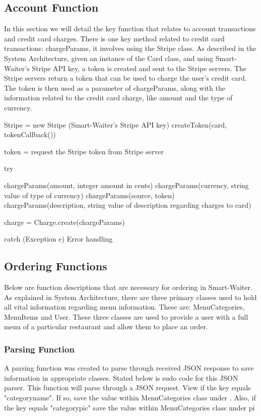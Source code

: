 \documentclass[12pt, titlepage]{article}
\begin{document}
\subsection{Account Function}
In this section we will detail the key function that relates to account transactions and credit card charges. There is one key method related to credit card transactions: chargeParams, it involves using the Stripe class. As described in the System Architecture, given an instance of the Card class, and using Smart-Waiter's Stripe API key, a token is created and sent to the Stripe servers. The Stripe servers return a token that can be used to charge the user's credit card. The token is then used as a parameter of chargeParams, along with the information related to the credit card charge, like amount and the type of currency. 

Stripe = new Stripe (Smart-Waiter's Stripe API key)
createToken(card, tokenCallback())

token = request the Stripe token from Stripe server

try{
	chargeParams(amount, integer amount in cents)
	chargeParams(currency, string value of type of currency)
	chargeParams(source, token)
	chargeParams(description, string value of description regarding charges to card)

	charge = Charge.create(chargeParams)
}
catch (Exception e){
	Error handling
}
\subsection{Ordering Functions}
Below are function descriptions that are necessary for ordering in Smart-Waiter. As explained in System Architecture, there are three primary classes used to hold all vital information regarding menu information. These are: MenuCategories, MenuItems and User. These three classes are used to provide a user with a full menu of a particular restaurant and allow them to place an order.

\subsubsection{Parsing Function}
A parsing function was created to parse through received JSON response to save information in appropriate classes. Stated below is sudo code for this JSON parser. This function will parse through a JSON request. View if the key equals "categoryname". If so, save the value within MenuCategories class under . Also, if the key equals "categorypic" save the value within MenuCategories  class under pi
\end{document}
